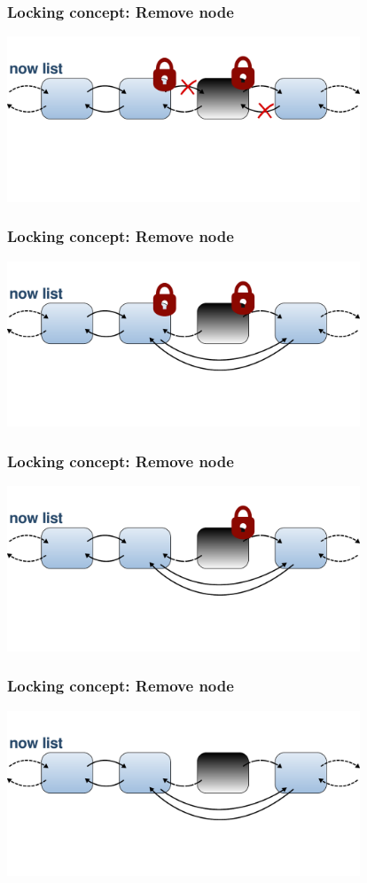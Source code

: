 \documentclass{beamer}
\begin{document}
\begin{frame}
\frametitle{Locking concept: Remove node}
\begin{center}
	\includegraphics[height=140pt]{remove4.pdf}
\end{center}
\end{frame}

\begin{frame}
\frametitle{Locking concept: Remove node}
\begin{center}
	\includegraphics[height=140pt]{remove5.pdf}
\end{center}
\end{frame}

\begin{frame}
\frametitle{Locking concept: Remove node}
\begin{center}
	\includegraphics[height=140pt]{remove6.pdf}
\end{center}
\end{frame}

\begin{frame}
\frametitle{Locking concept: Remove node}
\begin{center}
	\includegraphics[height=140pt]{remove7.pdf}
\end{center}
\end{frame}
\end{document}
